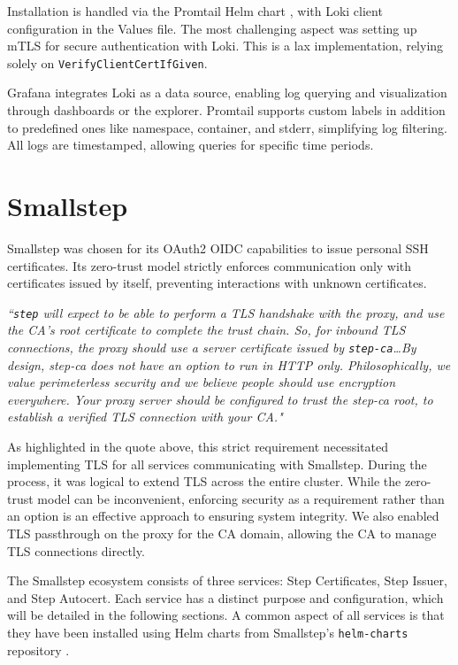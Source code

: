 Installation is handled via the Promtail Helm chart \parencite{grafana_promtail_helm}, with Loki client configuration in the Values file. The most challenging aspect was setting up mTLS for secure authentication with Loki. This is a lax implementation, relying solely on \texttt{VerifyClientCertIfGiven}.

Grafana integrates Loki as a data source, enabling log querying and visualization through dashboards or the explorer. Promtail supports custom labels in addition to predefined ones like namespace, container, and stderr, simplifying log filtering. All logs are timestamped, allowing queries for specific time periods.

\section{Smallstep}\label{sec:smallstep}
Smallstep was chosen for its OAuth2 OIDC capabilities to issue personal SSH certificates. Its zero-trust model strictly enforces communication only with certificates issued by itself, preventing interactions with unknown certificates.

\begin{displayquote}
    \textit{``\texttt{step} will expect to be able to perform a TLS handshake with the proxy, and use the CA's root certificate to complete the trust chain. So, for inbound TLS connections, the proxy should use a server certificate issued by \texttt{step-ca}\ldots By design, step-ca does not have an option to run in HTTP only. Philosophically, we value perimeterless security and we believe people should use encryption everywhere. Your proxy server should be configured to trust the step-ca root, to establish a verified TLS connection with your CA."}
\end{displayquote}
    \hspace*{}

As highlighted in the quote above, this strict requirement necessitated implementing TLS for all services communicating with Smallstep. During the process, it was logical to extend TLS across the entire cluster. While the zero-trust model can be inconvenient, enforcing security as a requirement rather than an option is an effective approach to ensuring system integrity. We also enabled TLS passthrough on the proxy for the CA domain, allowing the CA to manage TLS connections directly.

The Smallstep ecosystem consists of three services: Step Certificates, Step Issuer, and Step Autocert. Each service has a distinct purpose and configuration, which will be detailed in the following sections. A common aspect of all services is that they have been installed using Helm charts from Smallstep's \texttt{helm-charts} repository \parencite{smallstep_helm_charts}.

